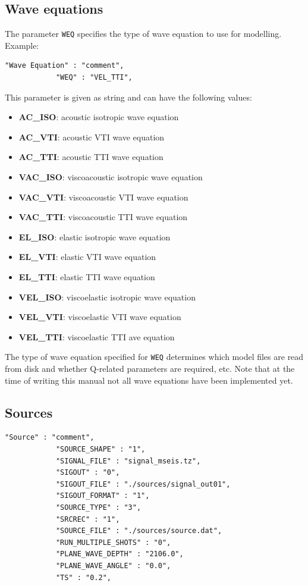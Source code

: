 \subsection{Wave equations}
The parameter \texttt{WEQ} specifies the type of wave equation to use for modelling. Example:
\begin{verbatim}
"Wave Equation" : "comment",
            "WEQ" : "VEL_TTI",
\end{verbatim}
This parameter is given as string and can have the following values:
\begin{itemize}
\item \textbf{AC\_ISO}: acoustic isotropic wave equation
\item \textbf{AC\_VTI}: acoustic VTI wave equation
\item \textbf{AC\_TTI}: acoustic TTI wave equation
\item \textbf{VAC\_ISO}: viscoacoustic isotropic wave equation
\item \textbf{VAC\_VTI}: viscoacoustic VTI wave equation
\item \textbf{VAC\_TTI}: viscoacoustic TTI wave equation
\item \textbf{EL\_ISO}: elastic isotropic wave equation
\item \textbf{EL\_VTI}: elastic VTI wave equation
\item \textbf{EL\_TTI}: elastic TTI wave equation
\item \textbf{VEL\_ISO}: viscoelastic isotropic wave equation
\item \textbf{VEL\_VTI}: viscoelastic VTI wave equation
\item \textbf{VEL\_TTI}: viscoelastic TTI ave equation
\end{itemize}
The type of wave equation specified for \texttt{WEQ} determines which model files are read from disk and whether Q-related parameters are required, etc. Note that at the time of writing this manual not all wave equations have been implemented yet.

\subsection{Sources}
\label{sources}
\begin{verbatim}
"Source" : "comment",
            "SOURCE_SHAPE" : "1",
            "SIGNAL_FILE" : "signal_mseis.tz",
            "SIGOUT" : "0",
            "SIGOUT_FILE" : "./sources/signal_out01",
            "SIGOUT_FORMAT" : "1",
            "SOURCE_TYPE" : "3",
            "SRCREC" : "1",
            "SOURCE_FILE" : "./sources/source.dat",
            "RUN_MULTIPLE_SHOTS" : "0",
            "PLANE_WAVE_DEPTH" : "2106.0",
            "PLANE_WAVE_ANGLE" : "0.0",
            "TS" : "0.2",
\end{verbatim}

